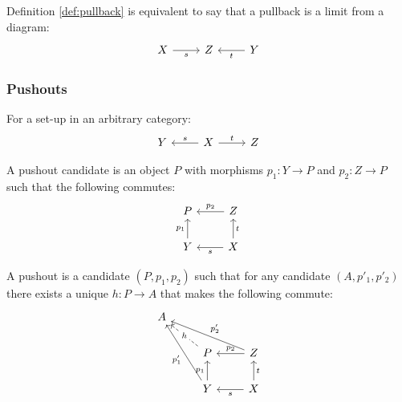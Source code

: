 \begin{definition}
  Definition \ref{def:pullback} is equivalent to say that a pullback is a
  limit from a diagram:
  \[\begin{tikzcd}[ampersand replacement=\&]
    X \& Z \& Y
    \arrow["t", from=1-3, to=1-2]
    \arrow["s"', from=1-1, to=1-2]
  \end{tikzcd}\]
\end{definition}

\subsubsection*{Pushouts}

\begin{definition}
  For a set-up in an arbitrary category:
  \parencite{leinster:basic_category_theory}
  \[\begin{tikzcd}[ampersand replacement=\&]
    Y \& X \& Z
    \arrow["t", from=1-2, to=1-3]
    \arrow["s"', from=1-2, to=1-1]
  \end{tikzcd}\]

  A pushout candidate is an object $P$ with morphisms $p_1: Y \to P$ and $p_2:
  Z\to P$ such that the following commutes:
  \[\begin{tikzcd}[ampersand replacement=\&]
    P \& Z \\
    Y \& X
    \arrow["t"', from=2-2, to=1-2]
    \arrow["s", from=2-2, to=2-1]
    \arrow["{p_1}", from=2-1, to=1-1]
    \arrow["{p_2}"', from=1-2, to=1-1]
  \end{tikzcd}\]

  A pushout is a candidate $(P, p_1, p_2)$ such that for any candidate $(A,
  p'_1, p'_2)$ there exists a unique $h:P\to A$ that makes the following
  commute:
  \[\begin{tikzcd}[ampersand replacement=\&]
    A \\
    \& P \& Z \\
    \& Y \& X
    \arrow["t"', from=3-3, to=2-3]
    \arrow["s", from=3-3, to=3-2]
    \arrow["{p_1}", from=3-2, to=2-2]
    \arrow["{p_2}"', from=2-3, to=2-2]
    \arrow["h"{description}, dashed, from=2-2, to=1-1]
    \arrow["{p'_1}", from=3-2, to=1-1]
    \arrow["{p'_2}"', from=2-3, to=1-1]
  \end{tikzcd}\]
\end{definition}

